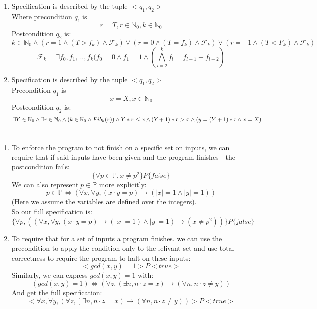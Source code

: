 \documentclass{article}
\begin{document}
\section{}
\begin{enumerate}[label=\Alph*.]
    \item Specification is described by the tuple $<q_1, q_2>$ \\
    Where precondition $q_1$ is $$r=T, r \in \mathbb{N}_0, k \in \mathbb{N}_0$$
    Postcondition $q_2$ is: $$k \in \mathbb{N}_0 \wedge (r=1 \wedge (T>f_k) \wedge \mathcal{F}_k) \vee (r=0 \wedge (T=f_k) \wedge \mathcal{F}_k) \vee (r=-1 \wedge (T<F_k) \wedge \mathcal{F}_k)$$
    $$\mathcal{F}_k = \exists f_0, f_1,...,f_k(f_0=0 \wedge f_1=1 \wedge ( \bigwedge\limits_{l=2}^k f_l=f_{l-1} + f_{l-2} ) $$
    \item Specification is described by the tuple $<q_1, q_2>$ \\
    Precondition $q_1$ is $$x=X, x \in \mathbb{N}_0$$
    Postcondition $q_2$ is:
    $$ \exists Y \in \mathbb{N}_0 \wedge \exists r \in \mathbb{N}_0 \wedge (k \in \mathbb{N}_0 \wedge Fib_k(r)) \wedge \\
    Y*r\leq x \wedge (Y+1)*r > x \wedge \\
    (y=(Y+1)*r \wedge x=X)$$
\end{enumerate}

\section{}
\begin{enumerate}[label=\Alph*.]
    \item To enforce the program to not finish
    on a specific set on inputs, we can require that if
    said inputs have been given and the program finishes - 
    the postcondition fails:
    \[\{\forall p\in\mathbb{P}, x\neq p^2\}P\{false\}\]
    We can also represent $p\in\mathbb{P}$ more explicitly:
    \[p\in\mathbb{P}\Leftrightarrow
    (\forall x,\forall y, (x\cdot y=p)\rightarrow (|x|=1\wedge|y|=1))\]
    (Here we assume the variables are defined over the integers).\\
    So our full specification is:
    \[\{\forall p,
    ((\forall x,\forall y, (x\cdot y=p)\rightarrow (|x|=1)\wedge|y|=1)
    \rightarrow
    (x\neq p^2))\}P\{false\}\]
    \item To require that for a set of inputs a program finishes.
    we can use the precondition to apply the condition only to
    the relivant set and use total correctness to require the program to halt
    on these inputs:
    \[<gcd(x,y)=1>P<true>\]
    Similarly, we can express $gcd(x,y)=1$ with:
    \[
        (gcd(x,y)=1)
    \Leftrightarrow
        (\forall z,(\exists n, n\cdot z=x)\rightarrow (\forall n, n\cdot z\neq y))
    \]
    And get the full specification:
    \[<\forall x,\forall y,(\forall z,(\exists n, n\cdot z=x)\rightarrow (\forall n, n\cdot z\neq y))>P<true>\]
\end{enumerate}
\end{document}

